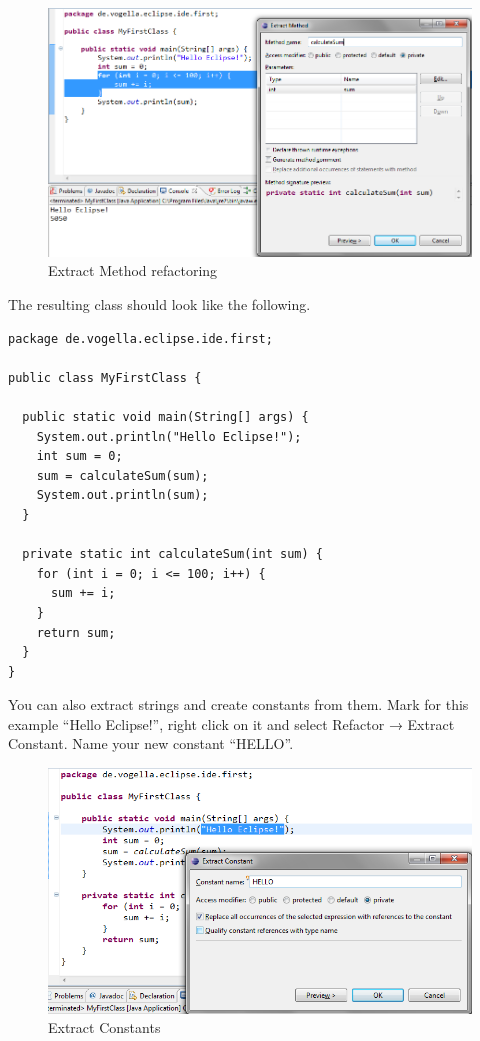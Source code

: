 \begin{figure}[htbp]
\centering
\includegraphics[scale=.5]{images/extract-method}
\caption{Extract Method refactoring}
\end{figure}

The resulting class should look like the following.

\begin{lstlisting}
package de.vogella.eclipse.ide.first;

public class MyFirstClass {

  public static void main(String[] args) {
    System.out.println("Hello Eclipse!");
    int sum = 0;
    sum = calculateSum(sum);
    System.out.println(sum);
  }

  private static int calculateSum(int sum) {
    for (int i = 0; i <= 100; i++) {
      sum += i;
    }
    return sum;
  }
} 
\end{lstlisting}

You can also extract strings and create constants from them. Mark for
this example ``Hello Eclipse!'', right click on it and select Refactor →
Extract Constant. Name your new constant ``HELLO''.

\begin{figure}[htbp]
\centering
\includegraphics[scale=.5]{images/constants}
\caption{Extract Constants}
\end{figure}

